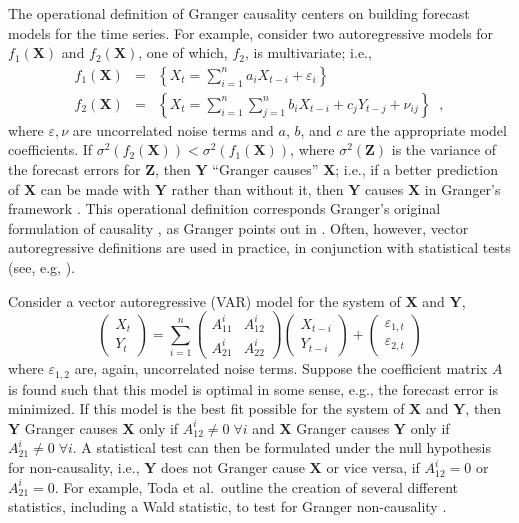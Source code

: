 \documentclass{article}[10pt]
\begin{document}
The operational definition of Granger causality centers on building forecast models for the time series.  For example, consider two autoregressive models for $f_1\left(\mathbf{X}\right)$ and $f_2\left(\mathbf{X}\right)$, one of which, $f_2$, is multivariate; i.e.,
\begin{eqnarray}
f_1\left(\mathbf{X}\right) &=& \left\{X_t = \sum_{i=1}^n a_i X_{t-i} + \varepsilon_i\right\}\\
f_2\left(\mathbf{X}\right) &=& \left\{X_t = \sum_{i=1}^n\sum_{j=1}^n b_i X_{t-i} + c_j Y_{t-j} + \nu_{ij}\right\}\;\;,
\end{eqnarray}
where $\varepsilon,\nu$ are uncorrelated noise terms and $a$, $b$, and $c$ are the appropriate model coefficients.  If $\sigma^2\left(f_2\left(\mathbf{X}\right)\right)<\sigma^2\left(f_1\left(\mathbf{X}\right)\right)$, where $\sigma^2\left(\mathbf{Z}\right)$ is the variance of the forecast errors for $\mathbf{Z}$, then $\mathbf{Y}$ ``Granger causes'' $\mathbf{X}$; i.e., if a better prediction of $\mathbf{X}$ can be made with $\mathbf{Y}$ rather than without it, then $\mathbf{Y}$ causes $\mathbf{X}$ in Granger's framework \cite{Schwert1979}.  This operational definition corresponds Granger's original formulation of causality \cite{Granger1963,Granger1969}, as Granger points out in \cite{Granger1980}.  Often, however, vector autoregressive definitions are used in practice, in conjunction with statistical tests (see, e.g, \cite{Lin2008,Ding2006}).

Consider a vector autoregressive (VAR) model for the system of $\mathbf{X}$ and $\mathbf{Y}$,
\begin{equation}
\label{eqn:VARex1}
\begin{pmatrix}
X_t \\ 
Y_t
\end{pmatrix} = \sum_{i=1}^n \begin{pmatrix}
A_{11}^i & A_{12}^i\\
A_{21}^i & A_{22}^i
\end{pmatrix}\begin{pmatrix}
X_{t-i} \\ 
Y_{t-i}
\end{pmatrix} + \begin{pmatrix}
\varepsilon_{1,t}\\
\varepsilon_{2,t}
\end{pmatrix}
\end{equation}
where $\varepsilon_{1,2}$ are, again, uncorrelated noise terms.  Suppose the coefficient matrix $A$ is found such that this model is optimal in some sense, e.g., the forecast error is minimized.  If this model is the best fit possible for the system of $\mathbf{X}$ and $\mathbf{Y}$, then $\mathbf{Y}$ Granger causes $\mathbf{X}$ only if $A_{12}^i\neq 0\;\forall i$ and $\mathbf{X}$ Granger causes $\mathbf{Y}$ only if $A_{21}^i\neq 0\;\forall i$.  A statistical test can then be formulated under the null hypothesis for non-causality, i.e., $\mathbf{Y}$ does not Granger cause $\mathbf{X}$ or vice versa, if $A_{12}^i = 0$ or $A_{21}^i = 0$.  For example, Toda et al.\ outline the creation of several different statistics, including a Wald statistic, to test for Granger non-causality \cite{Toda1994}.
\end{document}
